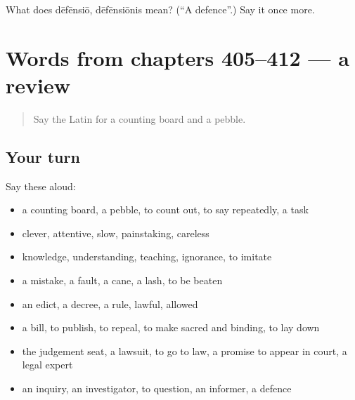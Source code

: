 \begin{tcolorbox}[breakable,colback=teal!4,colframe=teal!35!black,title={Before you move on}]
What does dēfēnsiō, dēfēnsiōnis mean? (\textquotedblleft{}A defence\textquotedblright{}.) Say it once more.
\end{tcolorbox}
\section[(dialogue)]{Words from chapters 405–412 — a review}

\label{lesson:LA-R412-review-405-412}



\begin{quote}
Say the Latin for a counting board and a pebble.
\end{quote}

\subsection*{Your turn}
Say these aloud:

\begin{itemize}
\raggedright
  \item a counting board, a pebble, to count out, to say repeatedly, a task
  \item clever, attentive, slow, painstaking, careless
  \item knowledge, understanding, teaching, ignorance, to imitate
  \item a mistake, a fault, a cane, a lash, to be beaten
  \item an edict, a decree, a rule, lawful, allowed
  \item a bill, to publish, to repeal, to make sacred and binding, to lay down
  \item the judgement seat, a lawsuit, to go to law, a promise to appear in court, a legal expert
  \item an inquiry, an investigator, to question, an informer, a defence
\end{itemize}

